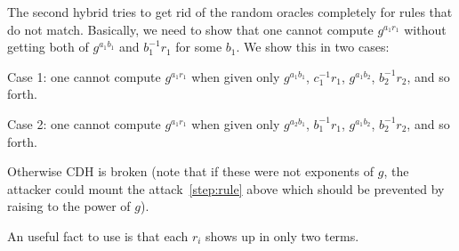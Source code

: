 The second hybrid tries to get rid of the random oracles completely for rules that do not match.
Basically, we need to show that one cannot compute $g^{a_1 r_1}$ without getting both of $g^{a_1 b_1}$ and $b_1^{-1} r_1$ for some $b_1$.
We show this in two cases:

Case 1:   one cannot compute $g^{a_1 r_1}$  when given only
$g^{a_1 b_1}$, $c_1^{-1} r_1$, $g^{a_1b_2}$, $b_2^{-1} r_2$, and so forth.

Case 2:   one cannot compute $g^{a_1 r_1}$  when given only
$g^{a_2 b_1}$, $b_1^{-1} r_1$, $g^{a_1b_2}$, $b_2^{-1} r_2$, and so forth.

Otherwise CDH is broken (note that if these were not exponents of $g$, the attacker could mount the attack~\ref{step:rule} above which should be prevented by raising to the power of $g$).

An useful fact to use is that each $r_i$ shows up in only two terms.


